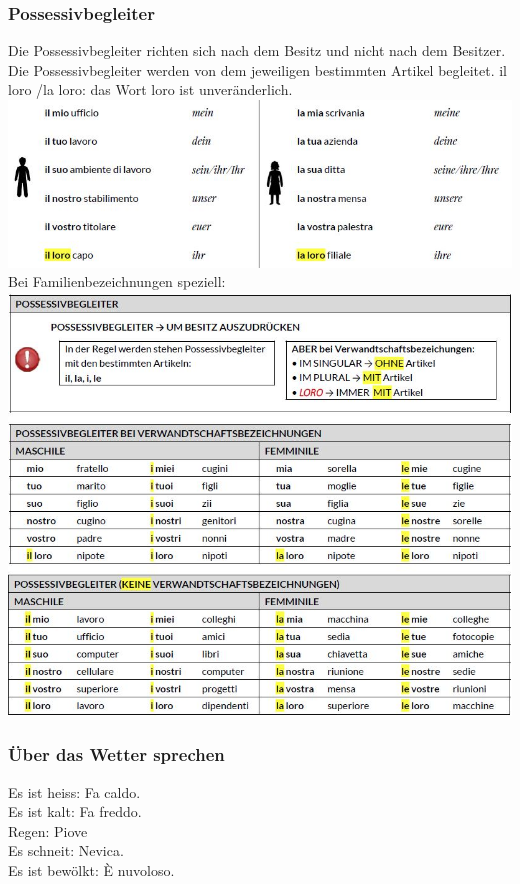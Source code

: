 \documentclass[10pt]{scrartcl}
\begin{document}
\subsubsection*{Possessivbegleiter}
Die Possessivbegleiter richten sich nach dem Besitz und nicht nach dem Besitzer. Die Possessivbegleiter werden von dem jeweiligen bestimmten Artikel begleitet. il loro /la loro:  das Wort loro ist unveränderlich.\\
\includegraphics[scale=.8]{images/pbegleiter.JPG}
\\
 Bei Familienbezeichnungen speziell:\\
\includegraphics[scale=.7]{images/pbegleiter2.JPG}
\subsubsection*{Über das Wetter sprechen}
Es ist heiss: Fa caldo.\\
Es ist kalt: Fa freddo.\\
Regen: Piove\\
Es schneit: Nevica.\\
Es ist bewölkt: È nuvoloso.
\end{document}
